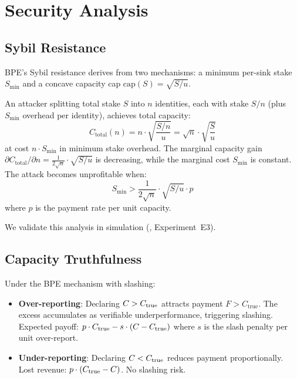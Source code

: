 \section{Security Analysis}
\label{sec:security}

\subsection{Sybil Resistance}

BPE's Sybil resistance derives from two mechanisms: a minimum per-sink stake
$S_{\min}$ and a concave capacity cap $\text{cap}(S) = \sqrt{S/u}$.

\begin{proposition}
An attacker splitting total stake $S$ into $n$ identities, each with stake $S/n$
(plus $S_{\min}$ overhead per identity), achieves total capacity:
\begin{equation}
C_{\text{total}}(n) = n \cdot \sqrt{\frac{S/n}{u}} = \sqrt{n} \cdot \sqrt{\frac{S}{u}}
\end{equation}
at cost $n \cdot S_{\min}$ in minimum stake overhead. The marginal capacity gain
$\partial C_{\text{total}} / \partial n = \frac{1}{2\sqrt{n}} \cdot \sqrt{S/u}$
is decreasing, while the marginal cost $S_{\min}$ is constant. The attack becomes
unprofitable when:
\begin{equation}
S_{\min} > \frac{1}{2\sqrt{n}} \cdot \sqrt{S/u} \cdot p
\end{equation}
where $p$ is the payment rate per unit capacity.
\end{proposition}

We validate this analysis in simulation (, Experiment~E3).

\subsection{Capacity Truthfulness}

Under the BPE mechanism with slashing:

\begin{itemize}
    \item \textbf{Over-reporting}: Declaring $C > C_{\text{true}}$ attracts payment
    $F > C_{\text{true}}$. The excess accumulates as verifiable underperformance,
    triggering slashing. Expected payoff: $p \cdot C_{\text{true}} - s \cdot (C - C_{\text{true}})$
    where $s$ is the slash penalty per unit over-report.

    \item \textbf{Under-reporting}: Declaring $C < C_{\text{true}}$ reduces payment
    proportionally. Lost revenue: $p \cdot (C_{\text{true}} - C)$. No slashing risk.
\end{itemize}

